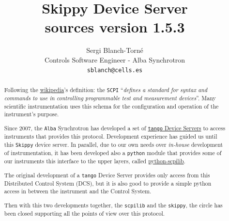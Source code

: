 \documentclass[a4paper,10pt]{article}
\title{Skippy Device Server \\
\large sources version 1.5.3}
\author{Sergi Blanch-Torn\'e\\\small{Controls Software Engineer - Alba Synchrotron}\\{\tt \small{sblanch@cells.es}}}
\begin{document}
\maketitle

\begin{abstract}
Following the \href{https://en.wikipedia.org/wiki/Standard_Commands_for_Programmable_Instruments}{wikipedia}'s definition:  the \texttt{SCPI} ``\emph{defines a standard for syntax and commands to use in controlling programmable test and measurement devices}''. Many scientific instrumentation uses this schema for the configuration and operation of the instrument's purpose.

Since 2007, the \texttt{Alba} Synchrotron has developed a set of \href{http://tango.controls.org}{\texttt{tango} Device Servers} to access instruments that provides this protocol. Development experience has guided us until this \texttt{Skippy} device server. In parallel, due to our own needs over \emph{in-house} development of instrumentation, it has been developed also a \texttt{python} module that provides some of our instruments this interface to the upper layers, called \href{https://github.com/srgblnch/python-scpilib}{python-scpilib}.

The original development of a \texttt{tango} Device Server provides only access from this Distributed Control System (DCS), but it is also good to provide a simple python access in between the instrument and the Control System.

Then with this two developments together, the \texttt{scpilib} and the \texttt{skippy}, the circle has been closed supporting all the points of view over this protocol.


\end{abstract}
\end{document}

